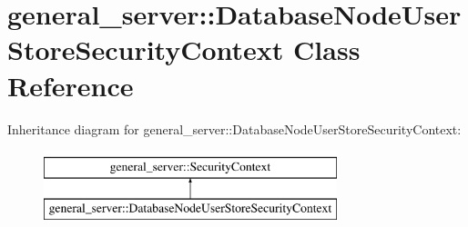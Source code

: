 \hypertarget{classgeneral__server_1_1DatabaseNodeUserStoreSecurityContext}{\section{general\-\_\-server\-:\-:\-Database\-Node\-User\-Store\-Security\-Context \-Class \-Reference}
\label{classgeneral__server_1_1DatabaseNodeUserStoreSecurityContext}
}
\-Inheritance diagram for general\-\_\-server\-:\-:\-Database\-Node\-User\-Store\-Security\-Context\-:\begin{figure}[H]
\begin{center}
\leavevmode
\includegraphics[height=2.000000cm]{classgeneral__server_1_1DatabaseNodeUserStoreSecurityContext}
\end{center}
\end{figure}

